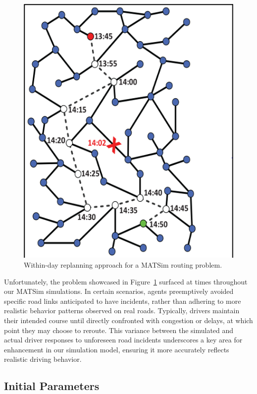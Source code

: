 \documentclass[fancy, oneside, mastersfancy, ms]{byuthesis}
\begin{document}
\begin{figure}

{\centering \includegraphics{figures/within_day.png}

}

\caption{\label{fig-within_day}Within-day replanning approach for a
MATSim routing problem.}

\end{figure}

Unfortunately, the problem showcased in Figure~\ref{fig-within_day}
surfaced at times throughout our MATSim simulations. In certain
scenarios, agents preemptively avoided specific road links anticipated
to have incidents, rather than adhering to more realistic behavior
patterns observed on real roads. Typically, drivers maintain their
intended course until directly confronted with congestion or delays, at
which point they may choose to reroute. This variance between the
simulated and actual driver responses to unforeseen road incidents
underscores a key area for enhancement in our simulation model, ensuring
it more accurately reflects realistic driving behavior.

\hypertarget{sec-parameters}{%
\subsection{Initial Parameters}\label{sec-parameters}}
\end{document}
